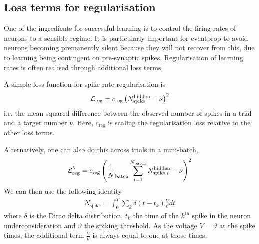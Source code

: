 \documentclass[a4paper]{article}
\begin{document}
  \subsection{Loss terms for regularisation}
  One of the ingredients for successful learning is to control the firing rates of neurons to a sensible regime. It is particularly important for eventprop to avoid neurons becoming premanently silent because they will not recover from this, due to learning being contingent on pre-synaptic spikes. Regularisation of learning rates is often realised through additional loss terms

  A simple loss function for spike rate regularisation is
  \begin{align}
    {\cal L}_{\text{reg}} = c_{\text{reg}}\left(N_{\text{spike}}^{\text{hidden}} - \nu\right)^2
  \end{align}
  i.e. the mean squared difference between the observed number of spikes in a trial and a target number $\nu$. Here, $c_{\text{reg}}$ is scaling the regularisation loss relative to the other loss terms.

  Alternatively, one can also do this across trials in a mini-batch,
  \begin{align}
    {\cal L}^b_{\text{reg}} = c_{\text{reg}} \left(\frac{1}{N}_{\text{batch}} \sum_{i=1}^{N_{\text{batch}}} N_{\text{spike}, i}^{\text{hidden}} - \nu\right)^2
  \end{align}
  We can then use the following identity
  \begin{align}
    N_{\text{spike}} = \int_0^T \sum_k \delta(t-t_{k})
    \frac{V}{\vartheta} dt
  \end{align}
  where $\delta$ is the Dirac delta distribution, $t_k$ the time of
  the $k^{\text{th}}$ spike in the neuron underconsideration and $\vartheta$ the
  spiking threshold. As the voltage $V= \vartheta$ at the spike times,
  the additional term $\frac{V}{\vartheta}$ is always equal to one at
  those times.
  
\end{document}
